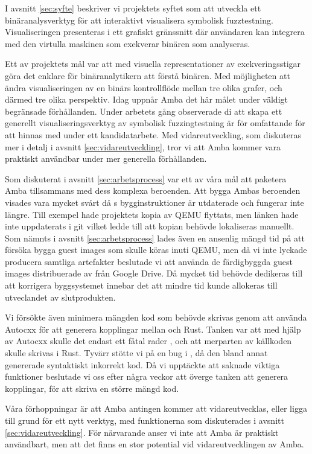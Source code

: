 I avsnitt \ref{sec:syfte} beskriver vi projektets syftet som att utveckla ett
binäranalysverktyg för att interaktivt visualisera symbolisk fuzztestning.
Visualiseringen presenteras i ett grafiskt gränssnitt där användaren kan
integrera med den virtulla maskinen som exekverar binären som analyseras.

Ett av projektets mål var att med visuella representationer av exekveringsstigar
göra det enklare för binäranalytikern att förstå binären. Med möjligheten att
ändra visualiseringen av en binärs kontrollflöde mellan tre olika grafer, och därmed
tre olika perspektiv. Idag uppnår Amba det här målet under väldigt begränsade
förhållanden. Under arbetets gång observerade di att skapa ett generellt
visualiseringsverktyg av symbolisk fuzzingtestning är för omfattande för att
hinnas med under ett kandidatarbete. Med vidareutveckling, som diskuteras mer
i detalj i avsnitt \ref{sec:vidareutveckling}, tror vi att Amba kommer vara
praktiskt användbar under mer generella förhållanden.

Som diskuterat i avsnitt \ref{sec:arbetsprocess} var ett av våra mål att
paketera Amba tillsammans med dess komplexa beroenden. Att bygga Ambas beroenden
visades vara mycket svårt då \stoe{}s bygginstruktioner är utdaterade och
fungerar inte längre. Till exempel hade \stoe{} projektets kopia av QEMU
flyttats, men länken hade inte uppdaterats i git vilket ledde till att kopian
behövde lokaliseras manuellt. Som nämnts i avsnitt \ref{sec:arbetsprocess} lades
även en ansenlig mängd tid på att försöka bygga guest images som skulle köras
inuti QEMU, men då vi inte lyckade producera samtliga artefakter beslutade vi
att använda de färdigbyggda guest images distribuerade av \stoe{} från Google
Drive. Då mycket tid behövde dedikeras till att korrigera byggsystemet innebar
det att mindre tid kunde allokeras till utveclandet av slutprodukten.

Vi försökte även minimera mängden  kod som behövde skrivas genom
att använda Autocxx för att generera kopplingar mellan  och Rust.
Tanken var att med hjälp av Autocxx skulle det endast ett fåtal rader
, och att merparten av källkoden skulle skrivas i Rust. Tyvärr
stötte vi på en bug i , då den bland annat genererade
syntaktiskt inkorrekt kod. Då vi upptäckte att  saknade
viktiga funktioner beslutade vi oss efter några veckor att överge tanken att
generera kopplingar, för att skriva en större mängd  kod.

Våra förhoppningar är att Amba antingen kommer att vidareutvecklas, eller ligga
till grund för ett nytt verktyg, med funktionerna som diskuterades i avsnitt
\ref{sec:vidareutveckling}. För närvarande anser vi inte att Amba är praktiskt
användbart, men att det finns en stor potential vid vidareutvecklingen av Amba.
